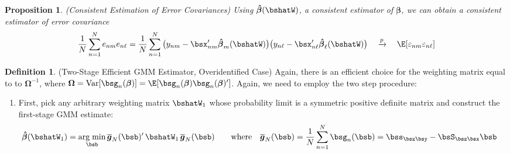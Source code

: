 \documentclass[12pt]{article}
\theoremstyle{plain}
\newtheorem{prop}[thm]{Proposition}
\theoremstyle{definition}
\newtheorem{defn}[thm]{Definition}
\theoremstyle{remark}
\newcommand{\bsbeta}{\boldsymbol{\beta}}
\newcommand{\bsOmega}{\boldsymbol{\Omega}}
\newcommand{\bshatbeta}{\boldsymbol{\hat{\beta}}}
\newcommand{\bsbarg}{\boldsymbol{\overline{g}}}
\DeclareMathOperator*{\argmin}{arg\;min}
\newcommand{\Var}{\operatorname{Var}}
\newcommand{\pto}{\xrightarrow{p}}
\newcommand{\sumnN}{\sum^N_{n=1}}
\begin{document}
\clearpage
\begin{prop}\emph{(Consistent Estimation of Error Covariances)}
Using $\bshatbeta(\bshatW)$, a consistent estimator of $\bsbeta$, we can
obtain a consistent estimator of error covariance
\begin{align*}
  \frac{1}{N} \sumnN e_{nm}e_{n\ell}
  =
  \frac{1}{N} \sumnN
  \big(y_{nm} - \bsx_{nm}'\bshatbeta_{m}(\bshatW)\big)
  \big(y_{n\ell} - \bsx_{n\ell}'\bshatbeta_{\ell}(\bshatW)\big)
  \quad\pto\quad
  \E[\varepsilon_{nm}\varepsilon_{n\ell}]
\end{align*}
\end{prop}

\begin{defn}(Two-Stage Efficient GMM Estimator, Overidentified Case)
Again, there is an efficient choice for the weighting matrix equal to to
$\bsOmega^{-1}$, where
$\bsOmega=\Var[\bsg_n(\bsbeta)]=\E[\bsg_n(\bsbeta)\bsg_n(\bsbeta)']$.
Again, we need to employ the two step procedure:
\begin{enumerate}[label=(\roman*)]
  \item First, pick any arbitrary weighting matrix $\bshatW_1$ whose
    probability limit is a symmetric positive definite matrix and
    construct the first-stage GMM estimate:
    \begin{align*}
      \bshatbeta(\bshatW_1) &=
      \argmin_{\bsb}
      \bsbarg_N(\bsb)' \, \bshatW_1 \, \bsbarg_N(\bsb)
      \qquad
      \text{where}\quad
      \bsbarg_N(\bsb)
      = \frac{1}{N} \sumnN \bsg_n(\bsb)
      = \bss_{\bsz\bsy} - \bsS_{\bsz\bsx}\bsb
    \end{align*}


\end{enumerate}
\end{defn}
\end{document}
